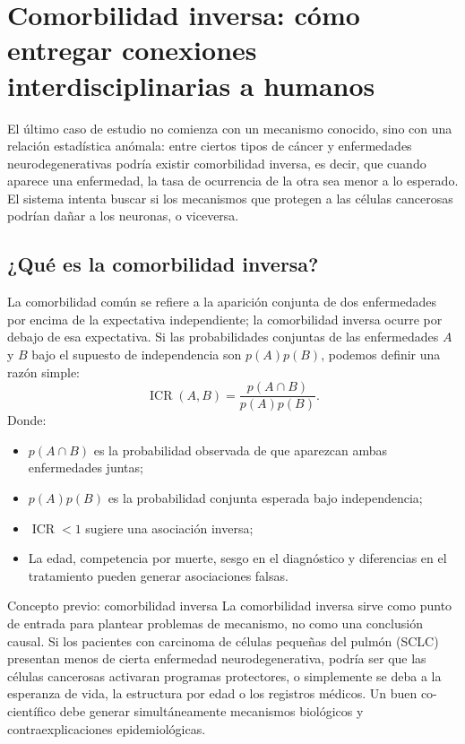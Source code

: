 \section{Comorbilidad inversa: cómo entregar conexiones interdisciplinarias a humanos}

El último caso de estudio no comienza con un mecanismo conocido, sino con una relación estadística anómala: entre ciertos tipos de cáncer y enfermedades neurodegenerativas podría existir comorbilidad inversa, es decir, que cuando aparece una enfermedad, la tasa de ocurrencia de la otra sea menor a lo esperado. El sistema intenta buscar si los mecanismos que protegen a las células cancerosas podrían dañar a los neuronas, o viceversa.

\subsection{¿Qué es la comorbilidad inversa?}

La comorbilidad común se refiere a la aparición conjunta de dos enfermedades por encima de la expectativa independiente; la comorbilidad inversa ocurre por debajo de esa expectativa. Si las probabilidades conjuntas de las enfermedades $A$ y $B$ bajo el supuesto de independencia son $p(A)p(B)$, podemos definir una razón simple:
$$
\operatorname{ICR}(A,B)=\frac{p(A\cap B)}{p(A)p(B)}.
$$
Donde:
\begin{itemize}
  \item $p(A\cap B)$ es la probabilidad observada de que aparezcan ambas enfermedades juntas;
  \item $p(A)p(B)$ es la probabilidad conjunta esperada bajo independencia;
  \item $\operatorname{ICR}<1$ sugiere una asociación inversa;
  \item La edad, competencia por muerte, sesgo en el diagnóstico y diferencias en el tratamiento pueden generar asociaciones falsas.
\end{itemize}

\begin{knowledgebox}{Concepto previo: comorbilidad inversa}
La comorbilidad inversa sirve como punto de entrada para plantear problemas de mecanismo, no como una conclusión causal. Si los pacientes con carcinoma de células pequeñas del pulmón (SCLC) presentan menos de cierta enfermedad neurodegenerativa, podría ser que las células cancerosas activaran programas protectores, o simplemente se deba a la esperanza de vida, la estructura por edad o los registros médicos. Un buen co-científico debe generar simultáneamente mecanismos biológicos y contraexplicaciones epidemiológicas.
\end{knowledgebox}

